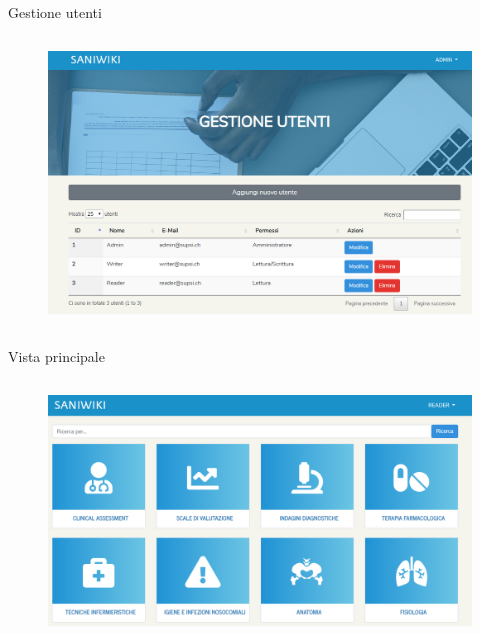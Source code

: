 \documentclass{beamer}
\begin{document}
\begin{frame}{Gestione utenti}
\begin{columns}
	\begin{figure}[!h]
		\includegraphics[scale=0.30]{saniwiki_gestioneutenti.png}
	\end{figure}
\end{columns}
\end{frame}

\begin{frame}[plain]{Vista principale}
\begin{columns}
	\begin{figure}[!h]
		\includegraphics[scale=0.35]{saniwiki_categorie.png}
	\end{figure}
\end{columns}
\end{frame}
\end{document}

